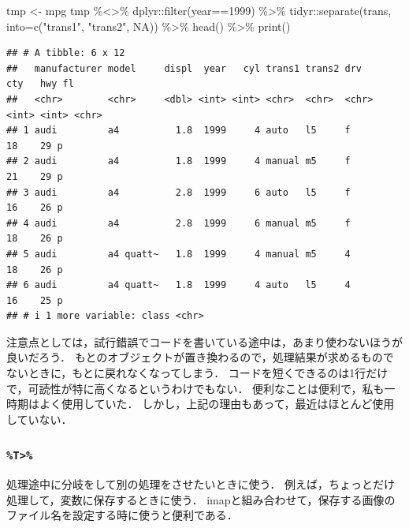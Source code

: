 \documentclass[
]{article}
\newenvironment{Shaded}{\begin{snugshade}}{\end{snugshade}}
\newcommand{\AttributeTok}[1]{\textcolor[rgb]{0.77,0.63,0.00}{#1}}
\newcommand{\ConstantTok}[1]{\textcolor[rgb]{0.00,0.00,0.00}{#1}}
\newcommand{\DecValTok}[1]{\textcolor[rgb]{0.00,0.00,0.81}{#1}}
\newcommand{\FunctionTok}[1]{\textcolor[rgb]{0.00,0.00,0.00}{#1}}
\newcommand{\NormalTok}[1]{#1}
\newcommand{\OtherTok}[1]{\textcolor[rgb]{0.56,0.35,0.01}{#1}}
\newcommand{\SpecialCharTok}[1]{\textcolor[rgb]{0.00,0.00,0.00}{#1}}
\newcommand{\StringTok}[1]{\textcolor[rgb]{0.31,0.60,0.02}{#1}}
\begin{document}
\begin{Shaded}
\begin{Highlighting}[]
\NormalTok{tmp }\OtherTok{\textless{}{-}}\NormalTok{ mpg}
\NormalTok{tmp }\SpecialCharTok{\%\textless{}\textgreater{}\%}
\NormalTok{  dplyr}\SpecialCharTok{::}\FunctionTok{filter}\NormalTok{(year}\SpecialCharTok{==}\DecValTok{1999}\NormalTok{) }\SpecialCharTok{\%\textgreater{}\%}
\NormalTok{  tidyr}\SpecialCharTok{::}\FunctionTok{separate}\NormalTok{(trans, }\AttributeTok{into=}\FunctionTok{c}\NormalTok{(}\StringTok{"trans1"}\NormalTok{, }\StringTok{"trans2"}\NormalTok{, }\ConstantTok{NA}\NormalTok{)) }\SpecialCharTok{\%\textgreater{}\%}
  \FunctionTok{head}\NormalTok{() }\SpecialCharTok{\%\textgreater{}\%}
  \FunctionTok{print}\NormalTok{()}
\end{Highlighting}
\end{Shaded}

\begin{verbatim}
## # A tibble: 6 x 12
##   manufacturer model     displ  year   cyl trans1 trans2 drv     cty   hwy fl   
##   <chr>        <chr>     <dbl> <int> <int> <chr>  <chr>  <chr> <int> <int> <chr>
## 1 audi         a4          1.8  1999     4 auto   l5     f        18    29 p    
## 2 audi         a4          1.8  1999     4 manual m5     f        21    29 p    
## 3 audi         a4          2.8  1999     6 auto   l5     f        16    26 p    
## 4 audi         a4          2.8  1999     6 manual m5     f        18    26 p    
## 5 audi         a4 quatt~   1.8  1999     4 manual m5     4        18    26 p    
## 6 audi         a4 quatt~   1.8  1999     4 auto   l5     4        16    25 p    
## # i 1 more variable: class <chr>
\end{verbatim}

注意点としては，試行錯誤でコードを書いている途中は，あまり使わないほうが良いだろう．
もとのオブジェクトが置き換わるので，処理結果が求めるものでないときに，もとに戻れなくなってしまう．
コードを短くできるのは1行だけで，可読性が特に高くなるというわけでもない．
便利なことは便利で，私も一時期はよく使用していた．
しかし，上記の理由もあって，最近はほとんど使用していない．

\hypertarget{t}{%
\subsubsection{\texorpdfstring{\texttt{\%T\textgreater{}\%}}{\%T\textgreater\%}}\label{t}}

処理途中に分岐をして別の処理をさせたいときに使う．
例えば，ちょっとだけ処理して，変数に保存するときに使う．
imapと組み合わせて，保存する画像のファイル名を設定する時に使うと便利である．
\end{document}
